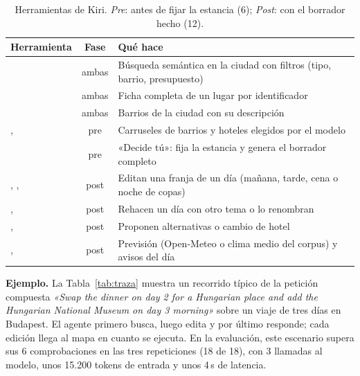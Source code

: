 \begin{table}[t]
\centering\scriptsize
\caption{Herramientas de Kiri. \emph{Pre}: antes de fijar la estancia (6); \emph{Post}: con el borrador hecho (12).}\label{tab:tools}
\begin{tabularx}{\columnwidth}{@{}L{2.45cm}cY@{}}
\toprule
\textbf{Herramienta} & \textbf{Fase} & \textbf{Qué hace} \\
\midrule
{} & ambas & Búsqueda semántica en la ciudad con filtros (tipo, barrio, presupuesto) \\
 & ambas & Ficha completa de un lugar por identificador \\
 & ambas & Barrios de la ciudad con su descripción \\
,  & pre & Carruseles de barrios y hoteles elegidos por el modelo \\
 & pre & «Decide tú»: fija la estancia y genera el borrador completo \\
, ,  & post & Editan una franja de un día (mañana, tarde, cena o noche de copas) \\
,  & post & Rehacen un día con otro tema o lo renombran \\
,  & post & Proponen alternativas o cambio de hotel \\
,  & post & Previsión (Open-Meteo o clima medio del corpus) y avisos del día \\
\bottomrule
\end{tabularx}
\end{table}

\textbf{Ejemplo.} La Tabla~\ref{tab:traza} muestra un recorrido típico de la petición
compuesta \emph{«Swap the dinner on day 2 for a Hungarian place and add the Hungarian National
Museum on day 3 morning»} sobre un viaje de tres días en Budapest. El agente primero busca,
luego edita y por último responde; cada edición llega al mapa en cuanto se ejecuta. En la
evaluación, este escenario supera sus 6 comprobaciones en las tres repeticiones (18 de 18), con 3
llamadas al modelo, unos 15.200 tokens de entrada y unos 4\,s de latencia.

